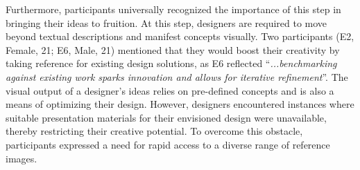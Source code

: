 






Furthermore, participants universally recognized the importance of this step in bringing their ideas to fruition.
At this step, designers are required to move beyond textual descriptions and manifest concepts visually.
Two participants (E2, Female, 21; E6, Male, 21) mentioned that they would boost their creativity by taking reference for existing design solutions, as E6 reflected ``\textit{...benchmarking against existing work sparks innovation and allows for iterative refinement}''.
The visual output of a designer's ideas relies on pre-defined concepts and is also a means of optimizing their design.
However, designers encountered instances where suitable presentation materials for their envisioned design were unavailable, thereby restricting their creative potential.
To overcome this obstacle, participants expressed a need for rapid access to a diverse range of reference images.


